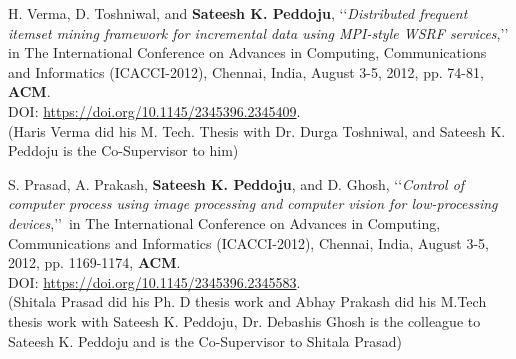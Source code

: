 \begin{etaremune}
	\item
	H. Verma, D. Toshniwal, and  \textbf{Sateesh K. Peddoju}, \lq\lq \textit{Distributed frequent itemset mining framework for incremental data using MPI-style WSRF services},\rq\rq\,in The International Conference on Advances in Computing, Communications and Informatics (ICACCI-2012), Chennai, India, August 3-5, 2012, pp. 74-81, \textbf{ACM}. \\DOI: \url{https://doi.org/10.1145/2345396.2345409}. \\(Haris Verma did his M. Tech. Thesis with Dr. Durga Toshniwal, and Sateesh K. Peddoju is the Co-Supervisor to him)

	
	\item
	S. Prasad, A. Prakash, \textbf{Sateesh K. Peddoju}, and D. Ghosh, \lq\lq \textit{Control of computer process using image processing and computer vision for low-processing devices},\rq\rq\, in The International Conference on Advances in Computing, Communications and Informatics (ICACCI-2012), Chennai, India, August 3-5, 2012, pp. 1169-1174, \textbf{ACM}. \\DOI: \url{https://doi.org/10.1145/2345396.2345583}. \\(Shitala Prasad did his Ph. D thesis work and Abhay Prakash did his M.Tech thesis work with Sateesh K. Peddoju, Dr. Debashis Ghosh is the colleague to Sateesh K. Peddoju and is the Co-Supervisor to Shitala Prasad)
	
 \end{etaremune}